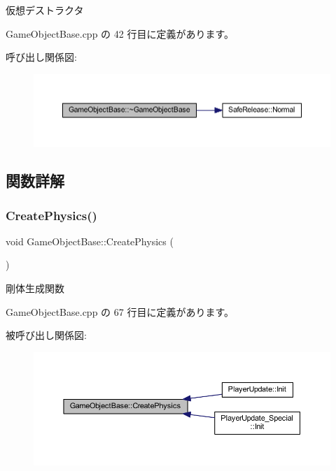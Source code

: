 仮想デストラクタ 



 Game\+Object\+Base.\+cpp の 42 行目に定義があります。

呼び出し関係図\+:\nopagebreak
\begin{figure}[H]
\begin{center}
\leavevmode
\includegraphics[width=350pt]{class_game_object_base_a0cb813d5c7af673a3d190eb1b2d26275_cgraph}
\end{center}
\end{figure}


\subsection{関数詳解}
\mbox{\label{class_game_object_base_adf7df49baa04363c63f9515317776e40}} 
\subsubsection{\texorpdfstring{Create\+Physics()}{CreatePhysics()}}
{\footnotesize\ttfamily void Game\+Object\+Base\+::\+Create\+Physics (\begin{DoxyParamCaption}{ }\end{DoxyParamCaption})}



剛体生成関数 



 Game\+Object\+Base.\+cpp の 67 行目に定義があります。

被呼び出し関係図\+:\nopagebreak
\begin{figure}[H]
\begin{center}
\leavevmode
\includegraphics[width=350pt]{class_game_object_base_adf7df49baa04363c63f9515317776e40_icgraph}
\end{center}
\end{figure}
\mbox{\label{class_game_object_base_a8158138ea811db49445845d8aaacaf3a}} 
